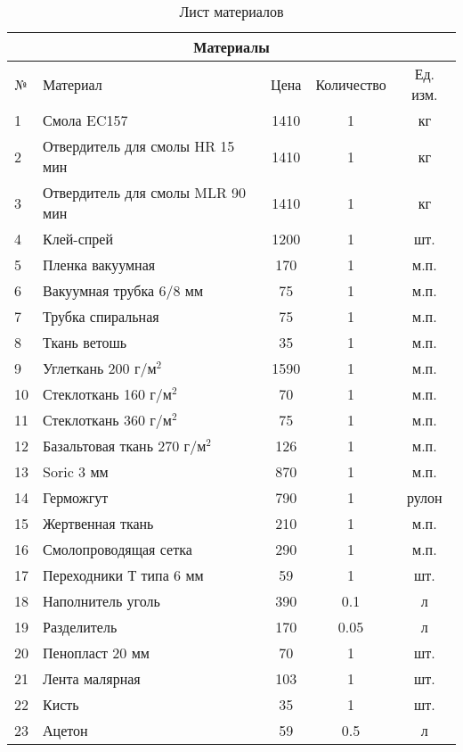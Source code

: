 \begin{table}[H]
    \caption{Лист материалов}
    \begin{center}
        \begin{tabular}{|p{0.5cm}|p{7cm}|c|c|c|}
            \hline
            \multicolumn{5}{|c|}{\textbf{Материалы}} \\
            \hline
            №& Материал & Цена & Количество & Ед. изм. \\
            \hline
            1 & Смола EC157 & 1410 & 1 & кг \\
            \hline
            2 &	Отвердитель для смолы HR 15 мин & 1410 & 1 & кг \\
            \hline
            3 & Отвердитель для смолы MLR 90 мин & 1410 & 1 & кг \\
            \hline
            4 & Клей-спрей & 1200 & 1	& шт. \\
            \hline
            5 & Пленка вакуумная & 170	& 1	& м.п. \\
            \hline
            6 & Вакуумная трубка 6/8 мм & 75	&1	& м.п. \\
            \hline
            7 & Трубка спиральная & 75&1	& м.п. \\
            \hline
            8 & Ткань ветошь & 35&	1	& м.п. \\
            \hline
            9 & Углеткань 200 г/м$^2$ & 1590 &1	& м.п. \\
            \hline
            10 & Стеклоткань 160 г/м$^2$ & 70	&1	& м.п. \\
            \hline
            11& Стеклоткань 360 г/м$^2$	& 75 &1	& м.п. \\
            \hline
            12 & Базальтовая ткань 270 г/м$^2$ &126	&1	& м.п. \\
            \hline
            13 & Soric 3 мм & 870 & 1 & м.п. \\
            \hline
            14 & Герможгут & 790 & 1 & рулон \\
            \hline
            15 & Жертвенная ткань & 210 & 1	& м.п. \\
            \hline
            16 & Смолопроводящая сетка & 290 & 1 & м.п. \\
            \hline
            17 & Переходники Т типа 6 мм & 59 & 1 & шт. \\
            \hline
            18 & Наполнитель уголь & 390 & 0.1 & л \\
            \hline
            19 & Разделитель & 170 & 0.05 & л \\
            \hline
            20 & Пенопласт 20 мм & 70 & 1 & шт. \\
            \hline
            21 & Лента малярная & 103 & 1 & шт. \\
            \hline
            22 & Кисть & 35 & 1	& шт. \\
            \hline
            23 & Ацетон & 59 & 0.5 & л \\
            \hline
        \end{tabular}
    \end{center}
\end{table}

